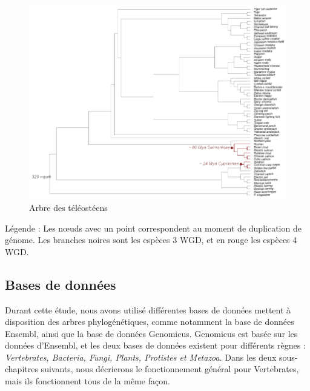 \begin{figure}[H]
    \centering
    \includegraphics[width=1\textwidth]{figures/corps/figure9.png}
    \caption{Arbre des téléostéens}
    \label{fig:9_teleosts}
\end{figure}
Légende : Les nœuds avec un point correspondent au moment de duplication de génome. Les branches noires sont les espèces 3 WGD, et en rouge les espèces 4 WGD. \\

\subsection{Bases de données}\label{bdd}
\par Durant cette étude, nous avons utilisé différentes bases de données mettent à disposition des arbres phylogénétiques, comme notamment la base de données Ensembl, ainsi que la base de données Genomicus. Genomicus est basée sur les données d’Ensembl, et les deux bases de données existent pour différents règnes : \textit{Vertebrates, Bacteria, Fungi, Plants, Protistes et Metazoa}. Dans les deux sous-chapitres suivants, nous décrierons le fonctionnement général pour Vertebrates, mais ils fonctionnent tous de la même façon. 


